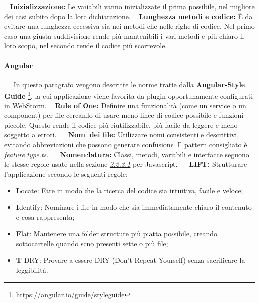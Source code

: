 	~\newline
	\textbf{Inizializzazione:} Le variabili vanno inizializzate il prima possibile, nel migliore dei casi subito dopo la loro dichiarazione. \newline
	~\newline
	\textbf{Lunghezza metodi e codice:} È da evitare una lunghezza eccessiva sia nei metodi che nelle righe di codice. Nel primo caso una giusta suddivisione rende più mantenibili i vari metodi e più chiaro il loro scopo, nel secondo rende il codice più scorrevole. \newline
	
	\paragraph{Angular} ~\newline ~\newline
	In questo paragrafo vengono descritte le norme tratte dalla \textbf{Angular-Style Guide} \footnote{\url{https://angular.io/guide/styleguide}}, la cui applicazione viene favorita da plugin opportunamente configurati in WebStorm\pedice.
	\newline
	~\newline
	\textbf{Rule of One:} Definire una funzionalità (come un service o un component) per file cercando di usare meno linee di codice possibile e funzioni piccole. Questo rende il codice più riutilizzabile, più facile da leggere e meno soggetto a errori.~\newline
	~\newline
	\textbf{Nomi dei file:} Utilizzare nomi consistenti e descrittivi, evitando abbreviazioni che possono generare confusione. Il pattern consigliato è \textit{feature.type.ts}.~\newline
	~\newline
	\textbf{Nomenclatura:} Classi, metodi, variabili e interfacce seguono le stesse regole usate nella sezione \textit{\underline{2.2.3.1}} per Javascript.~\newline
	~\newline
	\textbf{LIFT:} Strutturare l'applicazione secondo le seguenti regole:
	\begin{itemize}
	    \item \textbf{L}ocate: Fare in modo che la ricerca del codice sia intuitiva, facile e veloce;
	    \item \textbf{I}dentify: Nominare i file in modo che sia immediatamente chiaro il contenuto e cosa rappresenta;
	    \item \textbf{F}lat: Mantenere una folder structure più piatta possibile, creando sottocartelle quando sono presenti sette o più file;
	    \item \textbf{T}-DRY: Provare a essere DRY (Don't Repeat Yourself) senza sacrificare la leggibilità.~\newline
	\end{itemize}
